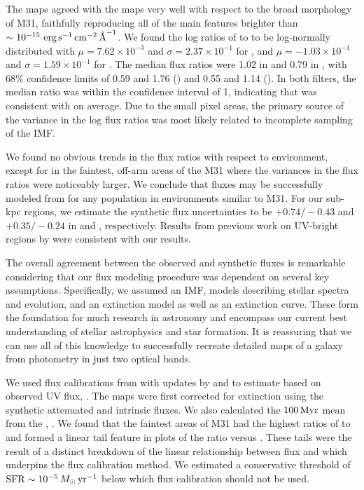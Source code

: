\documentclass[iop, tighten]{emulateapj}
\begin{document}
The \fxsfh{} maps agreed with the \fxobs{} maps very well with respect to the
broad morphology of M31, faithfully reproducing all of the main features
brighter than $\sim 10^{-15}\, \,\mathrm{erg}\,\mathrm{s}^{-1}\,\mathrm{cm}^{-2}\,\textrm{\AA}^{-1}$. We found the log ratios of \fxsfh{} to
\fxobs{} to be log-normally distributed with $\mu = 7.62\times 10^{-3}$ and
$\sigma = 2.37\times 10^{-1}$ for \fuv{}, and $\mu = -1.03\times 10^{-1}$ and
$\sigma = 1.59\times 10^{-1}$ for \nuv{}. The median flux ratios were 1.02 in
\fuv{} and 0.79 in \nuv{}, with 68\% confidence limits of 0.59 and 1.76
(\fuv{}) and 0.55 and 1.14 (\nuv{}). In both filters, the median ratio was
within the confidence interval of 1, indicating that \fxsfh{} was consistent
with \fxobs{} on average. Due to the small pixel areas, the primary source of
the variance in the log flux ratios was most likely related to incomplete
sampling of the IMF.

We found no obvious trends in the flux ratios with respect to environment,
except for in the faintest, off-arm areas of the M31 where the variances in the
flux ratios were noticeably larger. We conclude that fluxes may be successfully
modeled from  for any population in environments similar to M31. For our
sub-kpc regions, we estimate the synthetic flux uncertainties to be
$+\!0.74/\!-\!0.43$ and $+\!0.35/\!-\!0.24$ in \fuv{} and \nuv{}, respectively.
Results from previous work on UV-bright regions by \citet{Simones:2014} were
consistent with our results.

The overall agreement between the observed and synthetic fluxes is remarkable
considering that our flux modeling procedure was dependent on several key
assumptions. Specifically, we assumed an IMF, models describing stellar spectra
and evolution, and an extinction model as well as an extinction curve. These
form the foundation for much research in astronomy and encompass our current
best understanding of stellar astrophysics and star formation. It is reassuring
that we can use all of this knowledge to successfully recreate detailed maps of
a galaxy from photometry in just two optical bands.

We used flux calibrations from \citet{Kennicutt:1998} with updates by
\citet{Hao:2011} and \citet{Murphy:2011} to estimate  based on observed
UV flux, \sfrx{}. The \fxobs{} maps were first corrected for extinction using
the synthetic attenuated and intrinsic fluxes. We also calculated the $100\,\mathrm{Myr}$
mean \sfr{} from the , \sfroneh{}. We found that the faintest areas of
M31 had the highest ratios of \sfrx{} to \sfroneh{} and formed a linear tail
feature in plots of the \sfr{} ratio versus \sfroneh{}. These tails were the
result of a distinct breakdown of the linear relationship between flux and
\sfr{} which underpins the flux calibration method. We estimated a conservative
threshold of $\mathrm{SFR} \sim 10^{-5}\,M_\odot\,\mathrm{yr}^{-1}$ below which flux calibration
should not be used.
\end{document}
